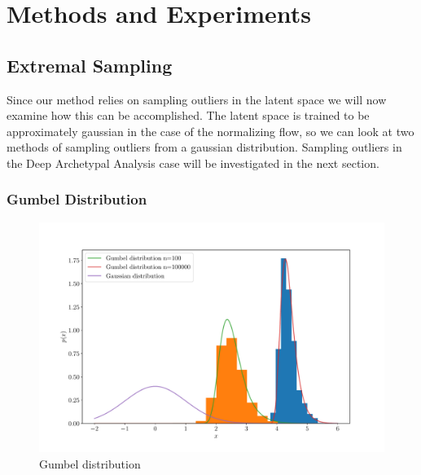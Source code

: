 \chapter{Methods and Experiments}%
\label{cha:methods}


\section{Extremal Sampling}%
\label{sec:extremal_sampling}

Since our method relies on sampling outliers in the latent space we will now
examine how this can be accomplished. The latent space is trained to be
approximately gaussian in the case of the normalizing flow, so we can look at
two methods of sampling outliers from a gaussian distribution. Sampling
outliers in the Deep Archetypal Analysis case will be investigated in the next
section.

\subsection{Gumbel Distribution}%
\label{sub:gumbel_distribution}

\begin{figure}[htpb]
    \centering
    \includegraphics[width=0.8\linewidth]{figures/gumbel_uni.pdf}
    \caption{Gumbel distribution}%
    \label{fig:gumbel_uni}
\end{figure}


